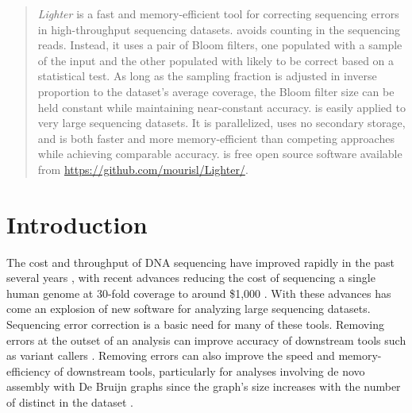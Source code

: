 \documentclass[10pt]{article}
\begin{document}
\begin{abstract}
\emph{Lighter} is a fast and memory-efficient tool for correcting sequencing errors in high-throughput sequencing datasets.
\tool avoids counting \kmers in the sequencing reads.
Instead, it uses a pair of Bloom filters, one populated with a sample of the input \kmers and the other populated with \kmers likely to be correct based on a statistical test.
As long as the sampling fraction is adjusted in inverse proportion to the dataset's average coverage, the Bloom filter size can be held constant while maintaining near-constant accuracy.
\tool is easily applied to very large sequencing datasets.  It is parallelized, uses no secondary storage, and is both faster and more memory-efficient than competing approaches while achieving comparable accuracy.
\tool is free open source software available from \url{https://github.com/mourisl/Lighter/}.
\end{abstract}




\section*{Introduction}
The cost and throughput of DNA sequencing have improved rapidly in the past several years \cite{glenn2011field}, with recent advances reducing the cost of sequencing a single human genome at 30-fold coverage to around \$1,000 \cite{1kgenomeforreal}.
With these advances has come an explosion of new software for analyzing large sequencing datasets.
Sequencing error correction is a basic need for many of these tools.
Removing errors at the outset of an analysis can improve accuracy of downstream tools such as variant callers \cite{kelley2010quake}.
Removing errors can also improve the speed and memory-efficiency of downstream tools, particularly for analyses involving de novo assembly with De Bruijn graphs since the graph's size increases with the number of distinct \kmers in the dataset \cite{pevzner2001eulerian, chaisson2004fragment}.
\end{document}
